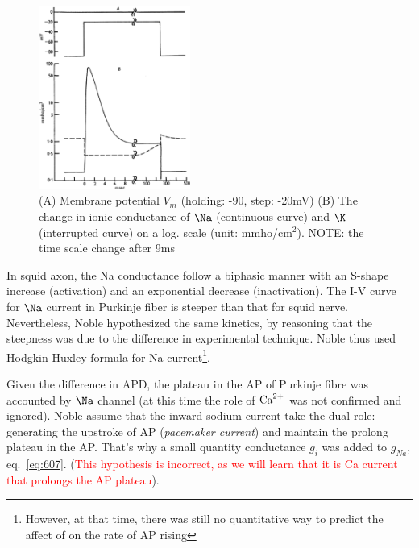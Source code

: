 \begin{figure}[hbt]
  \centerline{\includegraphics[height=6cm]{./images/Purkinjie_conductance.eps}}
  \caption{(A) Membrane potential $V_m$ (holding: -90, step: -20mV)
    (B) The change in ionic conductance of $\Na$ (continuous curve) and $\K$
    (interrupted curve) on a log. scale (unit: mmho/cm$^2$). NOTE: the time
    scale change after 9ms}
  \label{fig:Purkinjie_conduct}
\end{figure}


In squid axon, the Na conductance follow a biphasic manner with an S-shape
increase (activation) and an exponential decrease (inactivation). The I-V curve
for $\Na$ current in Purkinje fiber is steeper than that for squid nerve.
Nevertheless, Noble hypothesized the same kinetics, by reasoning that the
steepness was due to the difference in experimental technique. Noble thus used
Hodgkin-Huxley formula for Na current\footnote{ However, at that time, there was
still no quantitative way to predict the affect of  on the rate of AP
rising}. 

Given the difference in APD, the plateau in the AP of Purkinje fibre was
accounted by $\Na$ channel (at this time the role of ${\text{Ca}^{2+}}$ was not confirmed and
ignored). Noble assume that the inward sodium current take the dual role:
generating the upstroke of AP ({\it pacemaker current}) and maintain the prolong
plateau in the AP. That's why a small quantity conductance $g_i$ was added to
$g_{Na}$, eq.~\eqref{eq:607}. (\textcolor{red}{This hypothesis is incorrect, as
we will learn that it is Ca current that prolongs the AP plateau}).


